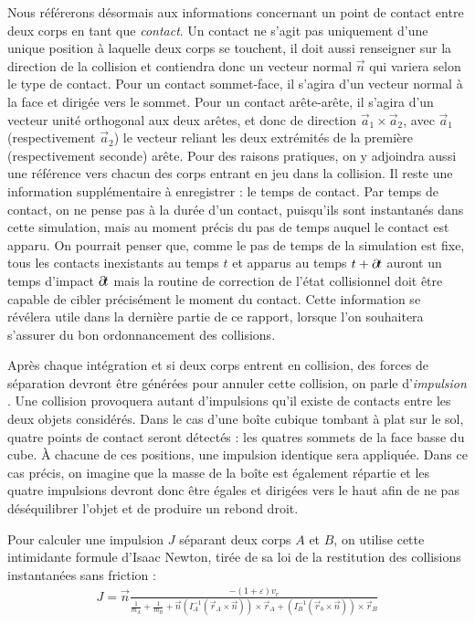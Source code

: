 Nous référerons désormais aux informations concernant un point de
contact entre deux corps en tant que \textit{contact}. Un contact ne
s'agit pas uniquement d'une unique position à laquelle deux corps se
touchent, il doit aussi renseigner sur la direction de la collision et
contiendra donc un vecteur normal $\vec{n}$ qui variera selon le type
de contact. Pour un contact sommet-face, il s'agira d'un vecteur
normal à la face et dirigée vers le sommet. Pour un contact
arête-arête, il s'agira d'un vecteur unité orthogonal aux deux arêtes,
et donc de direction $\vec{a}_1 \times \vec{a}_2$, avec $\vec{a}_1$
(respectivement $\vec{a}_2$) le vecteur reliant les deux extrémités de
la première (respectivement seconde) arête. Pour des raisons
pratiques, on y adjoindra aussi une référence vers chacun des corps
entrant en jeu dans la collision. Il reste une information
supplémentaire à enregistrer : le temps de contact. Par temps de
contact, on ne pense pas à la durée d'un contact, puisqu'ils sont
instantanés dans cette simulation, mais au moment précis du pas de
temps auquel le contact est apparu. On pourrait penser que, comme le
pas de temps de la simulation est fixe, tous les contacts inexistants
au temps $t$ et apparus au temps $t + \partial \! t$ auront un temps
d'impact $\partial \! t$ mais la routine de correction de l'état
collisionnel doit être capable de cibler précisément le moment du
contact. Cette information se révélera utile dans la dernière partie
de ce rapport, lorsque l'on souhaitera s'assurer du bon ordonnancement
des collisions.

Après chaque intégration et si deux corps entrent en collision, des
forces de séparation devront être générées pour annuler cette
collision, on parle d'\textit{impulsion} \cite{mirtich}. Une collision
provoquera autant d'impulsions qu'il existe de contacts entre les
deux objets considérés. Dans le cas d'une boîte cubique tombant à plat
sur le sol, quatre points de contact seront détectés : les quatres
sommets de la face basse du cube. \`A chacune de ces positions, une
impulsion identique sera appliquée. Dans ce cas précis, on imagine que
la masse de la boîte est également répartie et les quatre impulsions
devront donc être égales et dirigées vers le haut afin de ne pas
déséquilibrer l'objet et de produire un rebond droit.

Pour calculer une impulsion $J$ séparant deux corps $A$ et $B$, on
utilise cette intimidante formule d'Isaac Newton, tirée de sa loi de
la restitution des collisions instantanées sans friction :
\begin{align*}
J = \vec{n} 
  \frac{-(1 + \varepsilon) v_r}{
  \frac{1}{m_A} +
  \frac{1}{m_B} +
  \vec{n}
  (I_A^{-1} (\vec{r}_A \times \vec{n})) \times \vec{r}_A +
  (I_B^{-1} (\vec{r}_b \times \vec{n})) \times \vec{r}_B
}
\end{align*}

